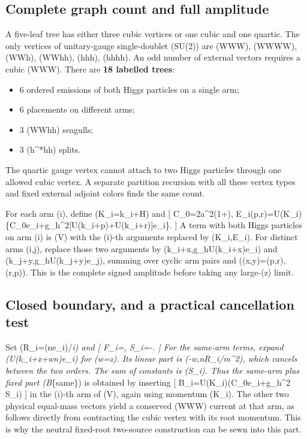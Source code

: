 \documentclass[
]{article}
\providecommand{\tightlist}{%
  \setlength{\itemsep}{0pt}\setlength{\parskip}{0pt}}
\begin{document}
\subsection{Complete graph count and full
amplitude}\label{complete-graph-count-and-full-amplitude}

A five-leaf tree has either three cubic vertices or one cubic and one
quartic. The only vertices of unitary-gauge single-doublet (SU(2)) are
(WWW), (WWWW), (WWh), (WWhh), (hhh), (hhhh). An odd number of external
vectors requires a cubic (WWW). There are \textbf{18 labelled trees}:

\begin{itemize}
\tightlist
\item
  6 ordered emissions of both Higgs particles on a single arm;
\item
  6 placements on different arms;
\item
  3 (WWhh) seagulls;
\item
  3 (h\^{}*\to hh) splits.
\end{itemize}

The quartic gauge vertex cannot attach to two Higgs particles through
one allowed cubic vertex. A separate partition recursion with all these
vertex types and fixed external adjoint colors finds the same count.

For each arm (i), define (K\_i=k\_i+H) and {[}
C\_0=2a\^{}2\left(1+\right),\qquad
E\_i(p,r)=U(K\_i)\{C\_0e\_i+g\_h\^{}2{[}U(k\_i+p)+U(k\_i+r){]}e\_i\}.
{]} A term with both Higgs particles on arm (i) is (V) with the (i)-th
arguments replaced by (K\_i,E\_i). For distinct arms (i,j), replace
those two arguments by (k\_i+x,g\_hU(k\_i+x)e\_i) and
(k\_j+y,g\_hU(k\_j+y)e\_j), summing over cyclic arm pairs and
((x,y)=(p,r),(r,p)). This is the complete signed amplitude before taking
any large-(z) limit.

\subsection{Closed boundary, and a practical cancellation
test}\label{closed-boundary-and-a-practical-cancellation-test}

Set (R\_i=(n\cdot e\_i)/\ell\emph{i) and {[}
F\_i=,\qquad
S\_i=-. {]} For the same-arm terms, expand
(U(k\_i+x+wn)e\_i) for (w=\pm z). Its linear part is (-w,nR\_i/m\^{}2),
which cancels between the two orders. The sum of constants is (S\_i).
Thus the same-arm plus fixed part (B}\{\rm same\}) is obtained by
inserting {[} B\_i=U(K\_i)(C\_0e\_i+g\_h\^{}2 S\_i) {]} in the (i)-th
arm of (V), again using momentum (K\_i). The other two physical
equal-mass vectors yield a conserved (WWW) current at that arm, as
follows directly from contracting the cubic vertex with its root
momentum. This is why the neutral fixed-root two-source construction can
be sewn into this part.
\end{document}
